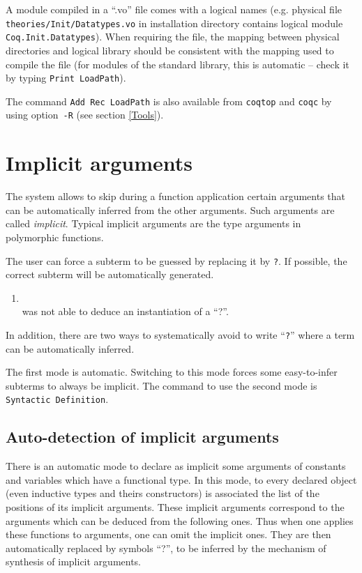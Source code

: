 {\begin{coq_example}
A module compiled in a ``.vo'' file comes with a logical names (e.g. 
physical file \verb!theories/Init/Datatypes.vo! in {\Coq} installation directory contains logical module {\tt Coq.Init.Datatypes}). 
When requiring the file, the mapping between physical directories and logical library should be consistent with the mapping used to compile the file (for modules of the standard library, this is automatic -- check it by typing {\tt Print LoadPath}).

The command {\tt Add Rec LoadPath} is also available from {\tt coqtop}
and {\tt coqc} by using option~\verb=-R= (see section \ref{Tools}).

\section{Implicit arguments}

The {\Coq} system allows to skip during a function application certain
arguments that can be automatically inferred from the other
arguments. Such arguments are called {\em implicit}. Typical implicit
arguments are the type arguments in polymorphic functions.

The user can force a subterm to be guessed by replacing it by
{\tt ?}. If possible, the correct subterm will be automatically generated.

\ErrMsg
\begin{enumerate}
\item {} \\
  {\Coq} was not able to deduce an instantiation of a ``?''.
\end{enumerate}

In addition, there are two ways to systematically avoid to write
``{\tt ?}'' where a term can be automatically inferred.

The first mode is automatic. Switching to this mode forces some
easy-to-infer subterms to always be implicit.
The command to use the second mode is  {\tt Syntactic
Definition}.

\subsection{Auto-detection of implicit arguments}
\label{Auto-implicit}

There is an automatic mode to declare as implicit some arguments of
constants and variables which have a functional type. In this mode,
to every declared object (even inductive types and theirs constructors) is
associated the list of the positions of its implicit arguments. These
implicit arguments correspond to the arguments which can be deduced
from the following ones. Thus when one applies these functions to
arguments, one can omit the implicit ones. They are then automatically
replaced by symbols ``?'', to be inferred by the mechanism of
synthesis of implicit arguments.


\end{coq_example}}
